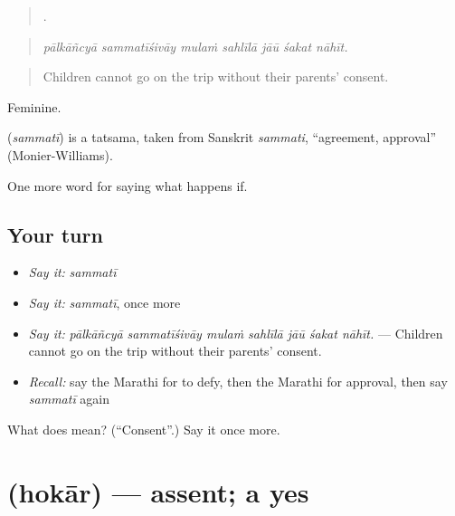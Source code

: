\begin{quote}
      .
\end{quote}

\begin{quote}
\emph{pālkāñcyā sammatīśivāy mulaṁ sahlīlā jāū śakat nāhīt.}
\end{quote}

\begin{quote}
Children cannot go on the trip without their parents' consent.
\end{quote}

Feminine.

\begin{cousinweb}
\textbf{} (\emph{sammatī}) is a tatsama, taken from Sanskrit \emph{sammati}, \textquotedblleft{}agreement, approval\textquotedblright{} (Monier-Williams).
\end{cousinweb}

\begin{grammarlens}[title={What you've built}]
One more word for saying what happens if.
\end{grammarlens}

\subsection*{Your turn}
\begin{itemize}
\raggedright
  \item \emph{Say it:} \emph{sammatī}
  \item \emph{Say it:} \emph{sammatī}, once more
  \item \emph{Say it:} \emph{pālkāñcyā sammatīśivāy mulaṁ sahlīlā jāū śakat nāhīt.} — Children cannot go on the trip without their parents' consent.
  \item \emph{Recall:} say the Marathi for to defy, then the Marathi for approval, then say \emph{sammatī} again
\end{itemize}

\begin{tcolorbox}[breakable,colback=teal!4,colframe=teal!35!black,title={Before you move on}]
What does  mean? (\textquotedblleft{}Consent\textquotedblright{}.) Say it once more.
\end{tcolorbox}
\section[\texorpdfstring{\mr{होकार} (hokār)}{होकार (hokār)}]{ (hokār) — assent; a yes}

